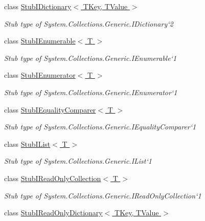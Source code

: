 \begin{DoxyCompactItemize}
class \hyperlink{class_system_1_1_collections_1_1_generic_1_1_fakes_1_1_stub_i_dictionary_3_01_t_key_00_01_t_value_01_4}{Stub\-I\-Dictionary$<$ T\-Key, T\-Value $>$}
\begin{DoxyCompactList}\small\item\em Stub type of System.\-Collections.\-Generic.\-I\-Dictionary`2\end{DoxyCompactList}\item 
class \hyperlink{class_system_1_1_collections_1_1_generic_1_1_fakes_1_1_stub_i_enumerable_3_01_t_01_4}{Stub\-I\-Enumerable$<$ T $>$}
\begin{DoxyCompactList}\small\item\em Stub type of System.\-Collections.\-Generic.\-I\-Enumerable`1\end{DoxyCompactList}\item 
class \hyperlink{class_system_1_1_collections_1_1_generic_1_1_fakes_1_1_stub_i_enumerator_3_01_t_01_4}{Stub\-I\-Enumerator$<$ T $>$}
\begin{DoxyCompactList}\small\item\em Stub type of System.\-Collections.\-Generic.\-I\-Enumerator`1\end{DoxyCompactList}\item 
class \hyperlink{class_system_1_1_collections_1_1_generic_1_1_fakes_1_1_stub_i_equality_comparer_3_01_t_01_4}{Stub\-I\-Equality\-Comparer$<$ T $>$}
\begin{DoxyCompactList}\small\item\em Stub type of System.\-Collections.\-Generic.\-I\-Equality\-Comparer`1\end{DoxyCompactList}\item 
class \hyperlink{class_system_1_1_collections_1_1_generic_1_1_fakes_1_1_stub_i_list_3_01_t_01_4}{Stub\-I\-List$<$ T $>$}
\begin{DoxyCompactList}\small\item\em Stub type of System.\-Collections.\-Generic.\-I\-List`1\end{DoxyCompactList}\item 
class \hyperlink{class_system_1_1_collections_1_1_generic_1_1_fakes_1_1_stub_i_read_only_collection_3_01_t_01_4}{Stub\-I\-Read\-Only\-Collection$<$ T $>$}
\begin{DoxyCompactList}\small\item\em Stub type of System.\-Collections.\-Generic.\-I\-Read\-Only\-Collection`1\end{DoxyCompactList}\item 
class \hyperlink{class_system_1_1_collections_1_1_generic_1_1_fakes_1_1_stub_i_read_only_dictionary_3_01_t_key_00_01_t_value_01_4}{Stub\-I\-Read\-Only\-Dictionary$<$ T\-Key, T\-Value $>$}

\end{DoxyCompactItemize}
